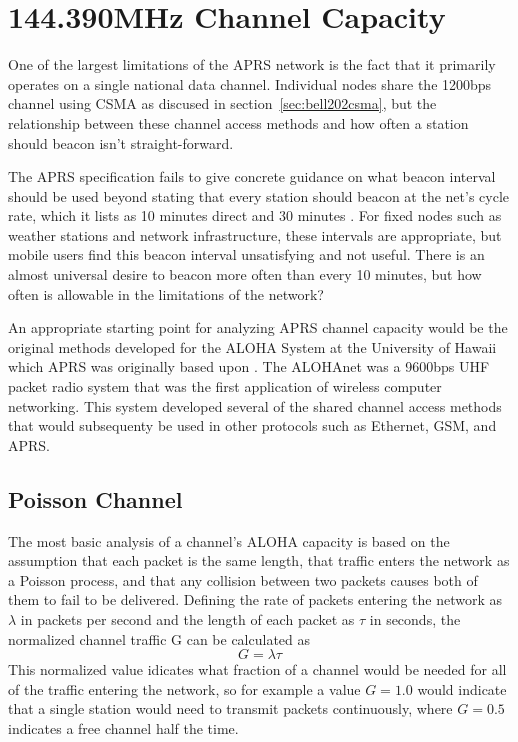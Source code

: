 \chapter{144.390MHz Channel Capacity}
\label{chap:channelcapacity}

One of the largest limitations of the APRS network is the fact that it primarily operates
on a single national data channel. Individual nodes share the 1200bps channel using 
CSMA as discused in section~\ref{sec:bell202csma}, but the relationship between 
these channel access methods and how often a station should beacon isn't straight-forward.

The APRS specification fails to give concrete guidance on what beacon interval should
be used beyond stating that every station should beacon at the net's cycle rate,
which it lists as 10 minutes direct and 30 minutes \cite[p.~9]{aprsspec}. 
For fixed nodes such as weather stations and network infrastructure, 
these intervals are appropriate, but mobile users find this beacon interval unsatisfying
and not useful. There is an almost universal desire to beacon more often than every 10 minutes,
but how often is allowable in the limitations of the network?

An appropriate starting point for analyzing APRS channel capacity would be the original methods
developed for the ALOHA System at the University of Hawaii
which APRS was originally based upon \cite{packetthroughput}.
The ALOHAnet was a 9600bps UHF packet radio system that was the first application of 
wireless computer networking. 
This system developed several of the shared channel access methods 
that would subsequenty be used in other protocols such as Ethernet, GSM, and APRS.

\section{Poisson Channel}

The most basic analysis of a channel's ALOHA capacity is based on the assumption that
each packet is the same length, that traffic enters the network as a Poisson process,
and that any collision between two packets causes both of them to fail to be delivered.
Defining the rate of packets entering the network as $\lambda$ in packets per second and
the length of each packet as $\tau$ in seconds, the normalized channel traffic G can be
calculated as
\begin{equation}
	G = \lambda \tau
\end{equation}
This normalized value idicates what fraction of a channel would be needed for all
of the traffic entering the network, so for example a value $G=1.0$ would indicate that
a single station would need to transmit packets continuously, where $G=0.5$ indicates 
a free channel half the time. 

